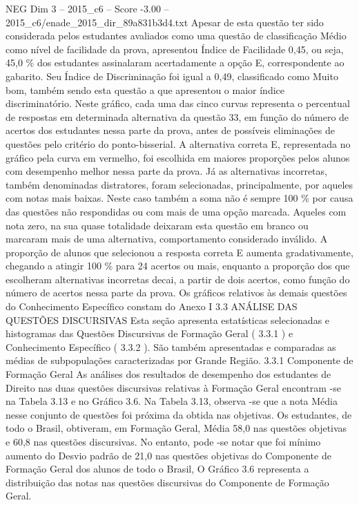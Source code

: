 \begin{textsample}{NEG Dim 3 – 2015\_c6 – Score -3.00 – 2015\_c6/enade\_2015\_dir\_89a831b3d4.txt}
Apesar de esta questão ter sido considerada pelos estudantes avaliados como uma questão de classificação Médio como nível de facilidade da prova, apresentou Índice de Facilidade 0,45, ou seja, 45,0 \% dos estudantes assinalaram acertadamente a opção E, correspondente ao gabarito.
Seu Índice de Discriminação foi igual a 0,49, classificado como Muito bom, também sendo esta questão a que apresentou o maior índice discriminatório.
Neste gráfico, cada uma das cinco curvas representa o percentual de respostas em determinada alternativa da questão 33, em função do número de acertos dos estudantes nessa parte da prova, antes de possíveis eliminações de questões pelo critério do ponto-bisserial.
A alternativa correta E, representada no gráfico pela curva em vermelho, foi escolhida em maiores proporções pelos alunos com desempenho melhor nessa parte da prova.
Já as alternativas incorretas, também denominadas distratores, foram selecionadas, principalmente, por aqueles com notas mais baixas.
Neste caso também a soma não é sempre 100 \% por causa das questões não respondidas ou com mais de uma opção marcada.
Aqueles com nota zero, na sua quase totalidade deixaram esta questão em branco ou marcaram mais de uma alternativa, comportamento considerado inválido.
A proporção de alunos que selecionou a resposta correta E aumenta gradativamente, chegando a atingir 100 \% para 24 acertos ou mais, enquanto a proporção dos que escolheram alternativas incorretas decai, a partir de dois acertos, como função do número de acertos nessa parte da prova.
Os gráficos relativos às demais questões do Conhecimento Específico constam do Anexo I 3.3 ANÁLISE DAS QUESTÕES DISCURSIVAS Esta seção apresenta estatísticas selecionadas e histogramas das Questões Discursivas de Formação Geral ( 3.3.1 ) e Conhecimento Específico ( 3.3.2 ).
São também apresentadas e comparadas as médias de subpopulações caracterizadas por Grande Região. 3.3.1 Componente de Formação Geral As análises dos resultados de desempenho dos estudantes de Direito nas duas questões discursivas relativas à Formação Geral encontram -se na Tabela 3.13 e no Gráfico 3.6.
Na Tabela 3.13, observa -se que a nota Média nesse conjunto de questões foi próxima da obtida nas objetivas.
Os estudantes, de todo o Brasil, obtiveram, em Formação Geral, Média 58,0 nas questões objetivas e 60,8 nas questões discursivas.
No entanto, pode -se notar que foi mínimo aumento do Desvio padrão de 21,0 nas questões objetivas do Componente de Formação Geral dos alunos de todo o Brasil, O Gráfico 3.6 representa a distribuição das notas nas questões discursivas do Componente de Formação Geral.

\end{textsample}
